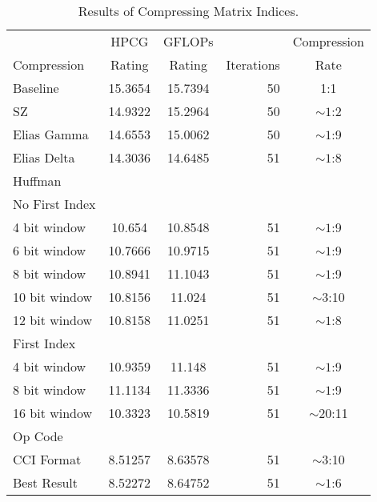 \begin{table}
	\centering
	\begin{tabular}{l|S[table-format=2.6]|S[table-format=2.6]|r|c}
		            & {HPCG}   & {GFLOPs} &            & Compression \\
		Compression & {Rating} & {Rating} & Iterations & Rate \\
		\hline
		Baseline & 15.3654 & 15.7394 & 50 & 1:1 \\ %
		SZ & 14.9322 & 15.2964 & 50 & \({\sim}1\):2 \\
		Elias Gamma & 14.6553 & 15.0062 & 50 & \({\sim}1\):9 \\
		Elias Delta & 14.3036 & 14.6485 & 51 & \({\sim}1\):8 \\
		Huffman & & & & \\
		\hspace{3mm}No First Index & & & & \\
			\hspace{6mm}4 bit window & 10.654 & 10.8548 & 51 & \({\sim}1\):9 \\
			\hspace{6mm}6 bit window & 10.7666 & 10.9715 & 51 &  \({\sim}1\):9 \\
			\hspace{6mm}8 bit window & 10.8941 & 11.1043 & 51 & \({\sim}1\):9 \\
			\hspace{6mm}10 bit window & 10.8156 & 11.024 & 51 & \({\sim}3\):10 \\
			\hspace{6mm}12 bit window & 10.8158 & 11.0251 & 51 & \({\sim}1\):8 \\
		\hspace{3mm}First Index & & & & \\
			\hspace{6mm}4 bit window & 10.9359 & 11.148 & 51 & \({\sim}1\):9 \\
			\hspace{6mm}8 bit window & 11.1134 & 11.3336 & 51 & \({\sim}1\):9 \\
			\hspace{6mm}16 bit window & 10.3323 & 10.5819 & 51 & \({\sim}20\):11 \\
		Op Code & & & & \\
		\hspace{3mm}CCI Format~\cite{Lawlor:2013:compression} & 8.51257 & 8.63578 & 51 & \({\sim}3\):10 \\
		\hspace{3mm}Best Result & 8.52272 & 8.64752 & 51 & \({\sim}1\):6 \\
	\end{tabular}
	\caption{Results of Compressing Matrix Indices.}
	\label{tab:results-ind}
\end{table}